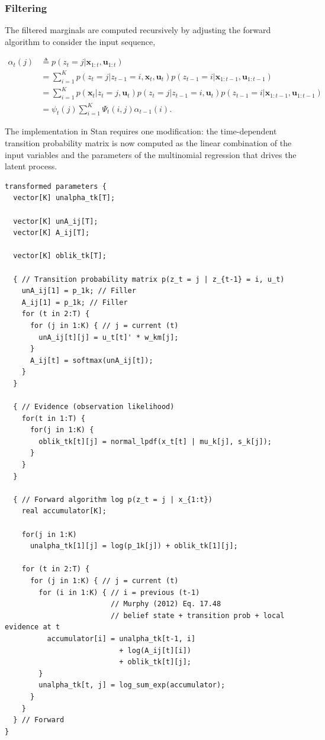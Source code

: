 \documentclass[]{article}
\newcommand{\mat}[1]{\mathbf{#1}}
\begin{document}
\subsubsection{Filtering}\label{filtering-1}

The filtered marginals are computed recursively by adjusting the forward
algorithm to consider the input sequence,

\begin{align*}
\alpha_t(j)
  & \triangleq p(z_t = j | \mat{x}_{1:t}, \mat{u}_{1:t}) \\
  & = \sum_{i = 1}^{K}{p(z_t = j | z_{t-1} = i, \mat{x}_{t}, \mat{u}_{t}) p(z_{t-1} = i | \mat{x}_{1:t-1}, \mat{u}_{1:t-1})} \\
  & = \sum_{i = 1}^{K}{p(\mat{x}_{t} | z_t = j, \mat{u}_t) p(z_t = j | z_{t-1} = i, \mat{u}_{t}) p(z_{t-1} = i | \mat{x}_{1:t-1}, \mat{u}_{1:t-1})} \\
  & = \psi_t(j) \sum_{i = 1}^{K}{\Psi_t(i, j) \alpha_{t-1}(i)}.
\end{align*}

The implementation in Stan requires one modification: the time-dependent
transition probability matrix is now computed as the linear combination
of the input variables and the parameters of the multinomial regression
that drives the latent process.

\begin{verbatim}
transformed parameters {
  vector[K] unalpha_tk[T];

  vector[K] unA_ij[T];
  vector[K] A_ij[T];

  vector[K] oblik_tk[T];

  { // Transition probability matrix p(z_t = j | z_{t-1} = i, u_t)
    unA_ij[1] = p_1k; // Filler
    A_ij[1] = p_1k; // Filler
    for (t in 2:T) {
      for (j in 1:K) { // j = current (t)
        unA_ij[t][j] = u_t[t]' * w_km[j];
      }
      A_ij[t] = softmax(unA_ij[t]);
    }
  }

  { // Evidence (observation likelihood)
    for(t in 1:T) {
      for(j in 1:K) {
        oblik_tk[t][j] = normal_lpdf(x_t[t] | mu_k[j], s_k[j]);
      }
    }
  }

  { // Forward algorithm log p(z_t = j | x_{1:t})
    real accumulator[K];

    for(j in 1:K)
      unalpha_tk[1][j] = log(p_1k[j]) + oblik_tk[1][j];

    for (t in 2:T) {
      for (j in 1:K) { // j = current (t)
        for (i in 1:K) { // i = previous (t-1)
                         // Murphy (2012) Eq. 17.48
                         // belief state + transition prob + local evidence at t
          accumulator[i] = unalpha_tk[t-1, i] 
                           + log(A_ij[t][i]) 
                           + oblik_tk[t][j];
        }
        unalpha_tk[t, j] = log_sum_exp(accumulator);
      }
    }
  } // Forward
}
\end{verbatim}
\end{document}
